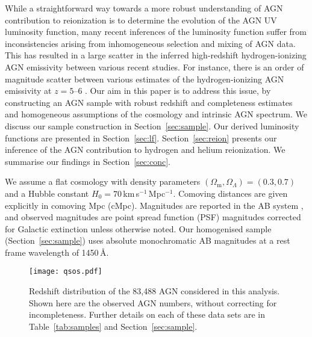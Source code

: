 \documentclass[fleqn,usenatbib]{mnras}
\begin{document}
While a straightforward way towards a more robust understanding of AGN
contribution to reionization is to determine the evolution of the AGN
UV luminosity function, many recent inferences of the luminosity
function suffer from inconsistencies arising from inhomogeneous
selection and mixing of AGN data.  This has resulted in a large
scatter in the inferred high-redshift hydrogen-ionizing AGN emissivity
between various recent studies.  For instance, there is an order of
magnitude scatter between various estimates of the hydrogen-ionizing
AGN emissivity at $z=5$--$6$ \citep{2011ApJ...728L..26G,
  2012ApJ...755..169M, 2015AA...578A..83G, 2018PASJ...70S..34A,
  2018AJ....155..131M, 2018MNRAS.474.2904P, 2017ApJ...847L..15O,
  2017MNRAS.466.1160M}.  Our aim in this paper is to address this
issue, by constructing an AGN sample with robust redshift and
completeness estimates and homogeneous assumptions of the cosmology
and intrinsic AGN spectrum.  We discuss our sample construction in
Section~\ref{sec:sample}.  Our derived luminosity functions are
presented in Section~\ref{sec:lf}.  Section~\ref{sec:reion} presents
our inference of the AGN contribution to hydrogen and helium
reionization.  We summarise our findings in Section~\ref{sec:conc}.

We assume a flat cosmology with density parameters
$\left(\Omega_\mathrm{m},\Omega_\Lambda\right)=\left(0.3,0.7\right)$
and a Hubble constant $H_0=70$\,km\,s$^{-1}$\,Mpc$^{-1}$. Comoving
distances are given explicitly in comoving Mpc (cMpc). Magnitudes
are reported in the AB system \citep{1983ApJ...266..713O}, and
observed magnitudes are point spread function (PSF) magnitudes
\citep{2002AJ....123..485S} corrected for Galactic extinction
\citep{1998ApJ...500..525S} unless otherwise noted.
Our homogenised sample (Section~\ref{sec:sample}) uses absolute
monochromatic AB magnitudes at a rest frame wavelength of 1450\,\AA.


\begin{figure*}
  \begin{center}
    \texttt{[image: qsos.pdf]}
  \end{center}
  \caption{Redshift distribution of the 83,488 AGN considered in this
    analysis.  Shown here are the observed AGN numbers, without
    correcting for incompleteness.  Further details on each of these
    data sets are in Table~\ref{tab:samples} and
    Section~\ref{sec:sample}.}
  \label{fig:qsos}
\end{figure*}
\end{document}
